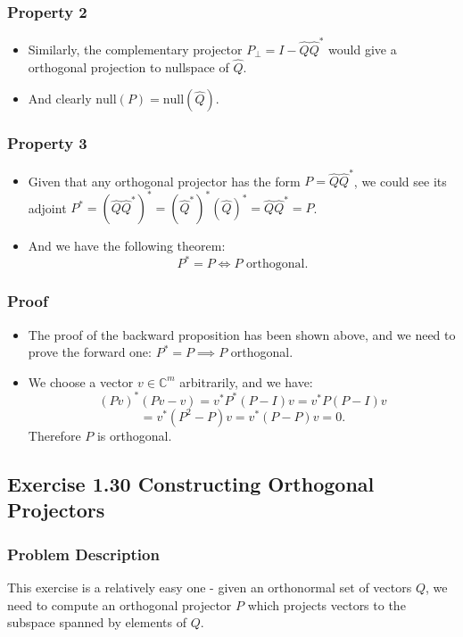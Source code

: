 \subsubsection*{Property 2}%
\begin{itemize}
\item Similarly, the complementary projector $P_{\bot} = I - \hat{Q}\hat{Q}^*$ would give a orthogonal projection to nullspace of $\hat{Q}$.
\item And clearly $\text{null}(P) = \text{null}(\hat{Q})$.
\end{itemize}
\subsubsection*{Property 3}%
\begin{itemize}
  \item Given that any orthogonal projector has the form $P = \hat{Q}\hat{Q}^*$, we could see its adjoint $P^* = (\hat{Q}\hat{Q}^*)^* = (\hat{Q}^*)^*(\hat{Q})^* = \hat{Q}\hat{Q}^* = P$. 
  \item And we have the following theorem:
    \[
    P^* = P \iff P  \text{ orthogonal}
    .\] 
\end{itemize}
\subsubsection*{Proof}%
\begin{itemize}
\item The proof of the backward proposition has been shown above, and we need to prove the forward one: $P^* = P \implies P$ orthogonal.
\item We choose a vector $v \in \mathbb{C}^{m}$ arbitrarily, and we have:
  \[
    (Pv)^{*}(Pv - v) = v^*P^*(P - I)v = v^*P(P - I)v 
  \]
  \[
  = v^*(P^2 - P)v = v^*(P - P)v = 0 
  .\] 
  Therefore $P$ is orthogonal.
\end{itemize}

\subsection*{Exercise 1.30 Constructing Orthogonal Projectors}
\subsubsection*{Problem Description}%
This exercise is a relatively easy one - given an orthonormal set of vectors $Q$, we need to compute an orthogonal projector  $P$ which projects vectors to the subspace spanned by elements of  $Q$.
